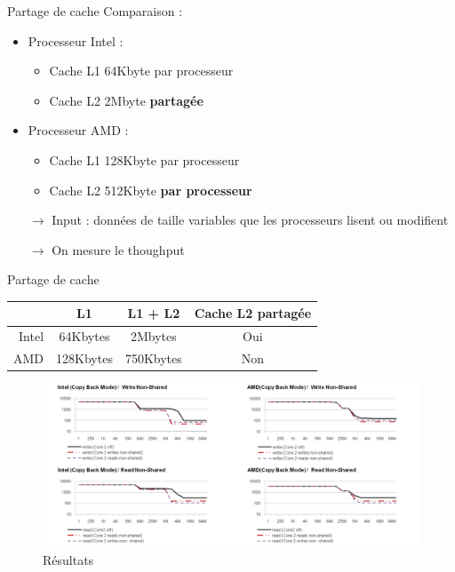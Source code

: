 \documentclass{beamer}
\begin{document}
\begin{frame}{Partage de cache}
	Comparaison :\pause
	\begin{itemize}
		\item Processeur Intel :
			\begin{itemize}
				\item Cache L1 64Kbyte par processeur
				\item Cache L2 2Mbyte \textbf{partagée}
			\end{itemize}\pause
		\item Processeur AMD :
			\begin{itemize}
				\item Cache L1 128Kbyte par processeur
				\item Cache L2 512Kbyte \textbf{par processeur}
			\end{itemize}\pause
	\end{itemize}
	\begin{itemize}
		\item[$\rightarrow$] Input : données de taille variables que les processeurs
			lisent ou modifient
		\item[$\rightarrow$] On mesure le thoughput\pause
	\end{itemize}
	\medskip
\end{frame}

\begin{frame}{Partage de cache}

	\begin{center}
		\begingroup
		\footnotesize
		\begin{tabular}{r|ccc}
		& L1 & L1 + L2 & Cache L2 partagée \\
		\hline
			Intel & 64Kbytes & 2Mbytes & Oui \\
			AMD & 128Kbytes & 750Kbytes & Non \\
		\end{tabular}
		\endgroup
	\end{center}

	\begin{figure}
		\centering
		\includegraphics[width=0.9\paperwidth]{results_cache_sharing.png}
		\caption{Résultats \cite{Fuch}}
		\label{fig:results_cache_sharing}
	\end{figure}	
\end{frame}
\end{document}

